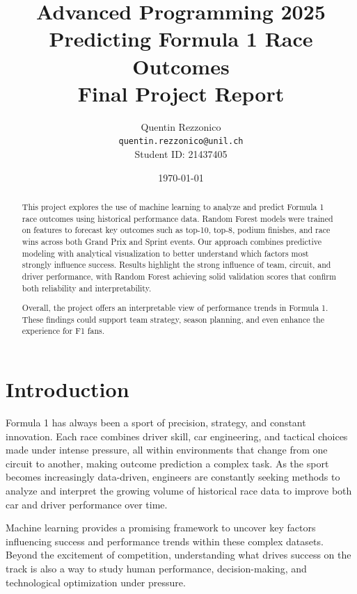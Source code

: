 \documentclass[11pt,a4paper]{article}
\title{%
    \Large \textbf{Advanced Programming 2025} \\
    \vspace{0.5cm}
    \LARGE \textbf{Predicting Formula 1 Race Outcomes} \\
    \vspace{0.3cm}
    \large Final Project Report
}
\author{
    Quentin Rezzonico \\
    \texttt{quentin.rezzonico@unil.ch} \\
    Student ID: 21437405
}
\date{\today}
\begin{document}
\maketitle
\thispagestyle{empty}

\begin{abstract}
This project explores the use of machine learning to analyze and predict Formula 1 race outcomes using historical performance data. Random Forest models were trained on features to forecast key outcomes such as top-10, top-8, podium finishes, and race wins across both Grand Prix and Sprint events. Our approach combines predictive modeling with analytical visualization to better understand which factors most strongly influence success. Results highlight the strong influence of team, circuit, and driver performance, with Random Forest achieving solid validation scores that confirm both reliability and interpretability.

Overall, the project offers an interpretable view of performance trends in Formula 1. These findings could support team strategy, season planning, and even enhance the experience for F1 fans.
\end{abstract}


\newpage
\tableofcontents
\newpage


\section{Introduction}
\label{sec:introduction}

Formula 1 has always been a sport of precision, strategy, and constant innovation. Each race combines driver skill, car engineering, and tactical choices made under intense pressure, all within environments that change from one circuit to another, making outcome prediction a complex task. As the sport becomes increasingly data-driven, engineers are constantly seeking methods to analyze and interpret the growing volume of historical race data to improve both car and driver performance over time.

Machine learning provides a promising framework to uncover key factors influencing success and performance trends within these complex datasets. Beyond the excitement of competition, understanding what drives success on the track is also a way to study human performance, decision-making, and technological optimization under pressure.


\end{document}
